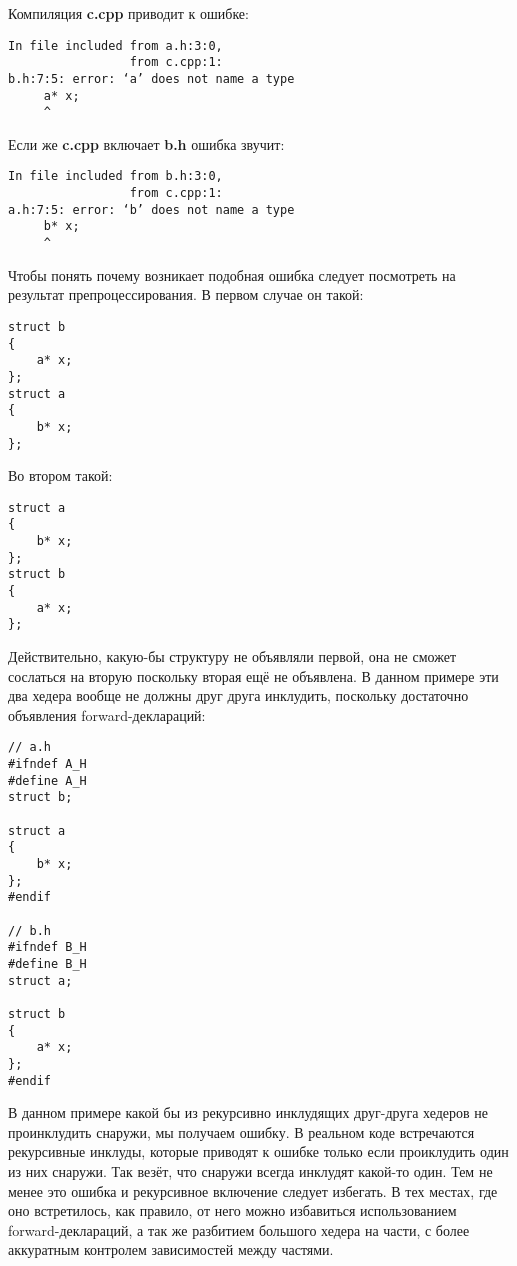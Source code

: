 Компиляция {\bf c.cpp} приводит к ошибке:
\begin{verbatim}
In file included from a.h:3:0,
                 from c.cpp:1:
b.h:7:5: error: ‘a’ does not name a type
     a* x;
     ^
\end{verbatim}

Если же {\bf c.cpp} включает {\bf b.h} ошибка звучит:
\begin{verbatim}
In file included from b.h:3:0,
                 from c.cpp:1:
a.h:7:5: error: ‘b’ does not name a type
     b* x;
     ^
\end{verbatim}

Чтобы понять почему возникает подобная ошибка следует посмотреть на результат препроцессирования. В первом случае он такой:
\begin{verbatim}
struct b
{
    a* x;
};
struct a
{
    b* x;
};
\end{verbatim}

Во втором такой:
\begin{verbatim}
struct a
{
    b* x;
};
struct b
{
    a* x;
};
\end{verbatim}

Действительно, какую-бы структуру не объявляли первой, она не сможет сослаться на вторую поскольку вторая ещё не объявлена. В данном примере эти два хедера вообще не должны друг друга инклудить, поскольку достаточно объявления forward-деклараций:

\begin{verbatim}
// a.h
#ifndef A_H
#define A_H
struct b;

struct a
{
    b* x;
};
#endif

// b.h
#ifndef B_H
#define B_H
struct a;

struct b
{
    a* x;
};
#endif
\end{verbatim}

В данном примере какой бы из рекурсивно инклудящих друг-друга хедеров не проинклудить снаружи, мы получаем ошибку. В реальном коде встречаются рекурсивные инклуды, которые приводят к ошибке только если проиклудить один из них снаружи. Так везёт, что снаружи всегда инклудят какой-то один. Тем не менее это ошибка и рекурсивное включение следует избегать. В тех местах, где оно встретилось, как правило, от него можно избавиться использованием forward-деклараций, а так же разбитием большого хедера на части, с более аккуратным контролем зависимостей между частями.

